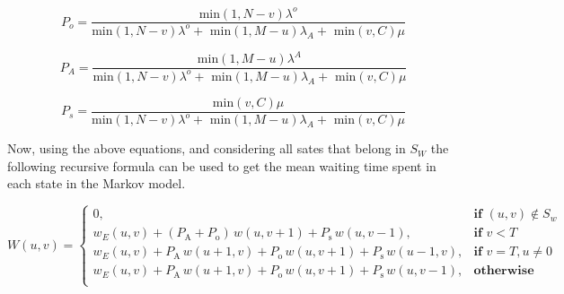 
\begin{equation}
    P_{o} = \frac{\text{min}(1, N - v)\lambda^o}{\text{min}(1, N - v)\lambda^o + \text{ min}(1, M - u)\lambda_A + \text{ min}(v,C)\mu}
\end{equation}

\begin{equation}
    P_{A} = \frac{\text{min}(1, M - u)\lambda^A}{\text{min}(1, N - v)\lambda^o + \text{ min}(1, M - u)\lambda_A + \text{ min}(v,C)\mu}    
\end{equation}

\begin{equation}
    P_{s} = \frac{\text{min}(v,C)\mu}{\text{min}(1, N - v)\lambda^o + \text{ min}(1, M - u)\lambda_A + \text{ min}(v,C)\mu}
\end{equation}

Now, using the above equations, and considering all sates that belong in \(S_W\) the following recursive formula can be used to get the mean waiting time spent in each state in the Markov model.

\begin{equation}
    W(u,v) = 
    \begin{cases}
        0, & \textbf{if } (u,v) \notin S_w \\
        w_E(u,v) + (P_{\text{A}} + P_{\text{o}}) \, w(u, v+1) +  P_{\text{s}} \, w(u, v-1), & \textbf{if } v < T\\
        w_E(u,v) + P_{\text{A}} \, w(u+1,v) + P_{\text{o}} \, w(u, v+1) +  P_{\text{s}} \, w(u-1, v),  & \textbf{if } v = T, u \neq 0 \\
        w_E(u,v) + P_{\text{A}} \, w(u+1,v) + P_{\text{o}} \, w(u, v+1) +  P_{\text{s}} \, w(u, v-1),  & \textbf{otherwise} \\
    \end{cases}
\end{equation}



